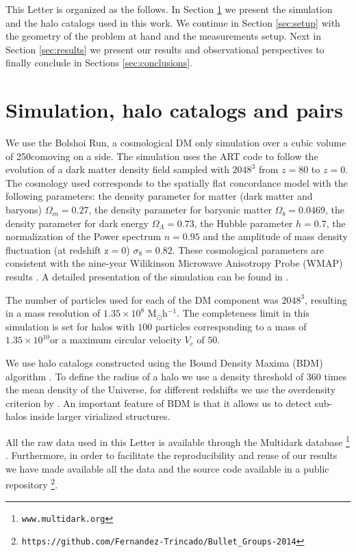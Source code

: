 \documentclass{emulateapj}
\newcommand{\hMpc}{{\ifmmode{h^{-1}{\rm Mpc}}\else{$h^{-1}$Mpc }\fi}}
\newcommand{\hMsun}{{\ifmmode{h^{-1}{\rm {M_{\odot}}}}\else{$h^{-1}{\rm{M_{\odot}}}$}\fi}}
\newcommand{\kms}{{\ifmmode{{\mathrm{\,km\ s}^{-1}}}\else{\,km~s$^{-1}$}\fi}}
\begin{document}
This Letter is organized as the follows. In Section
\ref{sec:simulation} we present the simulation and the halo catalogs
used in this work. We continue in Section \ref{sec:setup} with the
geometry of the problem at hand and the measurements setup. Next in
Section \ref{sec:results} we present our results and observational
perspectives to finally conclude in Sections \ref{sec:conclusions}. 


\section{Simulation, halo catalogs and pairs}
\label{sec:simulation}

We use the Bolshoi Run, a cosmological DM only simulation over a cubic
volume of 250\hMpc comoving on a side. The simulation uses the ART code to
follow the evolution of a dark matter density field sampled with
$2048^3$ from $z=80$ to $z=0$. The cosmology used  corresponds
to  the spatially flat concordance model with the following
parameters:  the density parameter for matter (dark matter and baryons)
$\Omega_m=0.27$, the density parameter for baryonic matter
$\Omega_b=0.0469$, the density parameter for dark energy
$\Omega_{\Lambda}=0.73$, the Hubble parameter $h=0.7$, the
normalization of the Power spectrum $n=0.95$ and the amplitude of mass
density fluctuation (at redshift z$=$0) $\sigma_8=0.82$.  These
cosmological parameters are consistent with the nine-year Wilikinson
Microwave Anisotropy Probe (WMAP) results \citep{hinshaw_etal13}. A
detailed presentation of the simulation can be found in
\citet{2011ApJ...740..102K}.     


The number of particles used for each of the DM component was
$2048^3$, resulting in a mass resolution of $1.35 \times 10^8$
M$_{\odot}$h$^{-1}$. The completeness limit in this simulation is set
for halos with $100$ particles corresponding to a mass of
$1.35\times10^{10}$\hMsun or a maximum circular velocity $V_{c}$ of
$50$\kms. 

We use halo catalogs constructed using the Bound Density Maxima (BDM)
algorithm \citep{BDM,BDMb}. To define the radius of a halo we use a
density threshold of 360 times the mean density of the Universe, for 
different redshifts we use the overdensity criterion by
\cite{Bryan1998}. An important feature of BDM is that it allows us to
detect sub-halos inside larger virialized structures. 


All the raw data used in this Letter is
available through the Multidark database \footnote{\texttt{www.multidark.org}}
\citep{Riebe2013}.  Furthermore, in order to facilitate the
reproducibility and reuse of our results we have made available all
the data and the source code available in a public
repository \footnote{\texttt{https://github.com/Fernandez-Trincado/Bullet\_Groups-2014}}.
\end{document}

